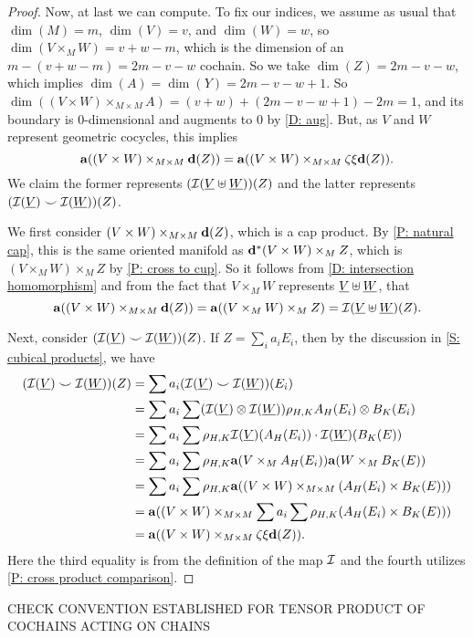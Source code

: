 \documentclass{amsart}
\begin{document}
\begin{proof}
Now, at last we can compute. To fix our indices, we assume as usual that $\dim(M)=m$, $\dim(V)=v$, and $\dim(W)=w$, so $\dim(V\times_MW)= v+w-m$, which is the dimension of an $m-(v+w-m)=2m-v-w$ cochain. So we take $\dim(Z)=2m-v-w$, which implies $\dim(A)=\dim(Y)=2m-v-w+1$. So $\dim((V\times W)\times_{M\times M}A)=(v+w)+(2m-v-w+1)-2m=1$, and its boundary is $0$-dimensional and augments to $0$ by \cref{D: aug}. But, as $V$ and $W$ represent geometric cocycles, 
this implies  $$\mathbf{a}((V\times W)\times_{M\times M}\mathbf{d}(Z))=\mathbf{a}((V\times W)\times_{M\times M}\zeta\xi\mathbf{d}(Z)).$$
We claim the former represents $(\mathcal{I}(\underline{V}\uplus\underline{W}))(Z)$ and the latter represents $(\mathcal{I}(\underline{V}) \smile \mathcal{I}(\underline{W}))(Z)$.

We first consider  $(V\times W)\times_{M\times M}\mathbf{d}(Z)$, which is a cap product. By \cref{P: natural cap}, this is the same oriented manifold as $\mathbf{d}^*(V\times W)\times_M Z$, which is $(V\times_MW)\times_M Z$ by \cref{P: cross to cup}. 
So it follows from \cref{D: intersection homomorphism} and from the fact that $V\times_MW$ represents $\underline{V}\uplus \underline{W}$, that $$\mathbf{a}((V\times W)\times_{M\times M}\mathbf{d}(Z))=\mathbf{a}((V\times_MW)\times_M Z)=\mathcal{I}(\underline{V}\uplus \underline{W})(Z).$$

Next, consider $(\mathcal{I}(\underline{V}) \smile \mathcal{I}(\underline{W}))(Z)$. If $Z=\sum_i a_iE_i$, then by the discussion in \cref{S: cubical products}, we have  
\begin{align*}
(\mathcal{I}(\underline{V}) \smile \mathcal{I}(\underline{W}))(Z)
&=\sum a_i (\mathcal{I}(\underline{V}) \smile \mathcal{I}(\underline{W}))(E_i)\\
&=\sum a_i\sum (\mathcal{I}(\underline{V}) \otimes \mathcal{I}(\underline{W}))  \rho_{H,K}A_H(E_i) \otimes B_K(E_i)\\
&=\sum a_i\sum \rho_{H,K}\mathcal{I}(\underline{V})(A_H(E_i))\cdot \mathcal{I}(\underline{W})(B_K(E))\\
&=\sum a_i\sum \rho_{H,K}\mathbf{a}(V\times_M A_H(E_i))\mathbf{a}(W\times_M B_K(E))\\
&=\sum a_i\sum \rho_{H,K}\mathbf{a}((V\times W)\times_{M\times M}( A_H(E_i)\times B_K(E)))\\
&=\mathbf{a}((V\times W)\times_{M\times M}\sum a_i\sum \rho_{H,K}( A_H(E_i)\times B_K(E)))\\
&=\mathbf{a}((V\times W)\times_{M\times M}\zeta\xi\mathbf{d}(Z)).\\
\end{align*}
Here the third equality is from the definition of the map $\mathcal{I}$ and the fourth utilizes \cref{P: cross product comparison}.
\end{proof}

CHECK CONVENTION ESTABLISHED FOR TENSOR PRODUCT OF COCHAINS ACTING ON CHAINS
\end{document}
